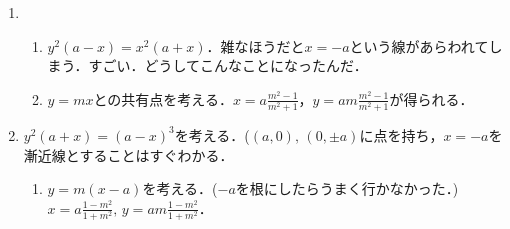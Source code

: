 \documentclass[9pt]{ltjsarticle}
\theoremstyle{break}
\theoremstyle{break}
\theoremstyle{break}
\theoremstyle{break}
\theoremstyle{break}
\theoremstyle{break}
\theoremstyle{break}
\theoremstyle{break}
\theoremstyle{break}
\theoremstyle{break}
\theoremstyle{break}
\theoremstyle{break}
\theoremstyle{break}
\theoremstyle{break}
\theoremstyle{break}
\theoremstyle{nonumberbreak}
\theoremstyle{nonumberbreak}
\begin{document}
\begin{enumerate}[label=(問題\arabic*)]
\begin{enumerate}[label=(\alph*)]
\end{enumerate}
 \item
\begin{enumerate}[label=(\alph*)]
 \item $y^2(a-x)=x^2(a+x)$．雑なほうだと$x=-a$という線があらわれてしまう．すごい．どうしてこんなことになったんだ．
 \item $y=mx$との共有点を考える．$x=a\frac{m^2-1}{m^2+1}$，$y=am\frac{m^2-1}{m^2+1}$が得られる．
\end{enumerate}
 \item $y^2(a+x)=(a-x)^3$を考える．($(a,0),\,(0,\pm a)$に点を持ち，$x=-a$を漸近線とすることはすぐわかる．
\begin{enumerate}[label=(\alph*)]
 \item $y=m(x-a)$を考える．($-a$を根にしたらうまく行かなかった．)
$x=a\frac{1-m^2}{1+m^2},\, y=am\frac{1-m^2}{1+m^2}$．


\end{enumerate}
\end{enumerate}
\end{document}
